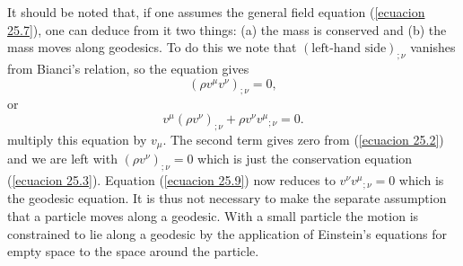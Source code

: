 It should be noted that, if one assumes the general field equation (\ref{ecuacion 25.7}), one can deduce from it two 
things: (a) the mass is conserved and  (b) the mass moves along geodesics. To do this we note that $(\mbox{left-hand 
side})_{;\nu}$ vanishes from Bianci's relation, so the equation gives
\[
\left( \rho v^\mu v^\nu \right)_{;\nu} = 0,
\]
or
\begin{equation}
 \label{ecuacion 25.9}
 v^\mu \left( \rho v^\nu \right)_{;\nu} + \rho v^\nu {v^\mu}_{;\nu} = 0.
\end{equation}
multiply this equation by $v_{\mu}$. The second term gives zero from (\ref{ecuacion 25.2}) and we are left with 
$\left( 
    \rho v^\nu
\right)_{;\nu} = 0$
which is just the conservation equation (\ref{ecuacion 25.3}). Equation (\ref{ecuacion 25.9}) now reduces to $v^\nu 
{v^\mu}_{;\nu} = 0$ which is the geodesic equation. It is thus not necessary to make the separate assumption that a 
particle moves along a geodesic. With a small particle the motion is constrained to lie along a geodesic by the 
application of Einstein's equations for empty space to the space around the particle.





